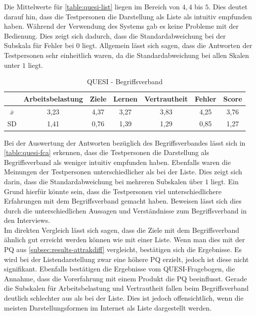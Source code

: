 Die Mittelwerte für \autoref{table:quesi-list} liegen im Bereich von $4,4$ bis $5$.
Dies deutet darauf hin, dass die Testpersonen die Darstellung als Liste als intuitiv empfunden haben.
Während der Verwendung des Systems gab es keine Probleme mit der Bedienung.
Dies zeigt sich dadurch, dass die Standardabweichung bei der Subskala für Fehler bei $0$ liegt.
Allgemein lässt sich sagen, dass die Antworten der Testpersonen sehr einheitlich waren, da die Standardabweichung bei allen Skalen unter $1$ liegt.

\begin{center}
    \begin{table}[!ht]
        \centering
        \begin{tabular}{|l|c|c|c|c|c|c|}
            \hline
                                                 & Arbeitsbelastung & Ziele & Lernen & Vertrautheit & Fehler & Score \\ \hline \hline
            \multicolumn{1}{|c|}{$\overline{x}$} & 3,23             & 4,37  & 3,27   & 3,83         & 4,25   & 3,76  \\ \hline
            \multicolumn{1}{|c|}{SD}             & 1,41             & 0,76  & 1,39   & 1,29         & 0,85   & 1,27  \\ \hline
        \end{tabular}
        \caption{QUESI - Begriffsverband}
        \label{table:quesi-fca}
    \end{table}
\end{center}

Bei der Auswertung der Antworten bezüglich des Begriffsverbandes lässt sich in \autoref{table:quesi-fca} erkennen, dass die Testpersonen die Darstellung als Begriffsverband als weniger intuitiv empfunden haben.
Ebenfalls waren die Meinungen der Testpersonen unterschiedlicher als bei der Liste.
Dies zeigt sich darin, dass die Standardabweichung bei mehreren Subskalen über $1$ liegt.
Ein Grund hierfür könnte sein, dass die Testpersonen viel unterschiedlichere Erfahrungen mit dem Begriffsverband gemacht haben.
Beweisen lässt sich dies durch die unterschiedlichen Aussagen und Verständnisse zum Begriffsverband in den Interviews.\\

Im direkten Vergleich lässt sich sagen, dass die Ziele mit dem Begriffsverband ähnlich gut erreicht werden können wie mit einer Liste.
Wenn man dies mit der \ac{PQ} aus \autoref{subsec:results-attrakdiff} vergleicht, bestätigen sich die Ergebnisse.
Es wird bei der Listendarstellung zwar eine höhere \ac{PQ} erzielt, jedoch ist diese nicht signifikant.
Ebenfalls bestätigen die Ergebnisse vom \ac{QUESI}-Fragebogen, die Annahme, dass die Vorerfahrung mit einem Produkt die \ac{PQ} beeinflusst.
Gerade die Subskalen für Arbeitsbelastung und Vertrautheit fallen beim Begriffsverband deutlich schlechter aus als bei der Liste.
Dies ist jedoch offensichtlich, wenn die meisten Darstellungsformen im Internet als Liste dargestellt werden.\\

